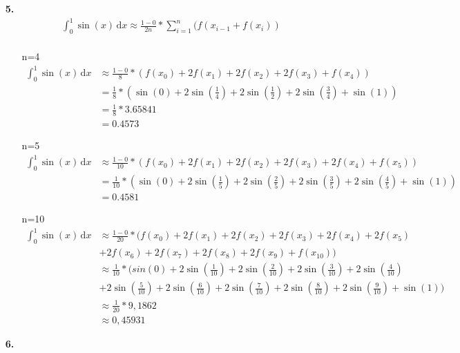\documentclass[a4paper,11pt,fleqn]{scrartcl}
\begin{document}
\begin{enumerate}
\item[\textbf{5.}]
	\begin{eqnarray*}
		\int_0^1 \! \sin(x) \, \mathrm{d}x \approx \frac{1-0}{2n}*\sum\limits_{i=1}^n(f(x_{i-1}+f(x_i))\\
	\end{eqnarray*}
	\begin{itemize}
		\item[n=4]
			\begin{align*}
				\int_0^1 \! \sin(x) \, \mathrm{d}x &\approx \frac{1-0}{8}*\left(f(x_0)+2f(x_1)+2f(x_2)+2f(x_3)+f(x_4)\right)\\
				&= \frac{1}{8}*\left(\sin\left(0\right)+2\sin\left(\frac{1}{4}\right)+2\sin\left(\frac{1}{2}\right)+2\sin\left(\frac{3}{4}\right)+\sin(1)\right) \\
				&= \frac{1}{8}*3.65841 \\
				&= 0.4573
			\end{align*}
		\item[n=5]
			\begin{align*}
				\int_0^1 \! \sin(x) \, \mathrm{d}x &\approx \frac{1-0}{10}*\left(f(x_0)+2f(x_1)+2f(x_2)+2f(x_3)+2f(x_4)+f(x_5)\right)\\
				&= \frac{1}{10}*\left(\sin\left(0\right)+2\sin\left(\frac{1}{5}\right)+2\sin\left(\frac{2}{5}\right)+2\sin\left(\frac{3}{5}\right)+2\sin\left(\frac{4}{5}\right)+\sin(1)\right) \\
				&= 0.4581
			\end{align*}
		\item[n=10]
			\begin{align*}
				\int_0^1 \! \sin(x) \, \mathrm{d}x &\approx \frac{1-0}{20}*(f(x_0)+2f(x_1)+2f(x_2)+2f(x_3)+2f(x_4)+2f(x_5)\\ &+2f(x_6)+2f(x_7)
+2f(x_8)+2f(x_9)+f(x_{10}))\\
				&\approx \frac{1}{10}*(sin(0)+2\sin\left(\frac{1}{10}\right)+2\sin\left(\frac{2}{10}\right)+2\sin\left(\frac{3}{10}\right)+2\sin\left(\frac{4}{10}\right)\\ &+2\sin\left(\frac{5}{10}\right)+2\sin\left(\frac{6}{10}\right)+2\sin\left(\frac{7}{10}\right)+2\sin\left(\frac{8}{10}\right)+2\sin\left(\frac{9}{10}\right)+\sin\left(1\right)) \\
				&\approx \frac{1}{20} * 9,1862 \\
				&\approx 0,45931
			\end{align*}
	\end{itemize}
            


\item[\textbf{6.}]

\end{enumerate}
\end{document}
